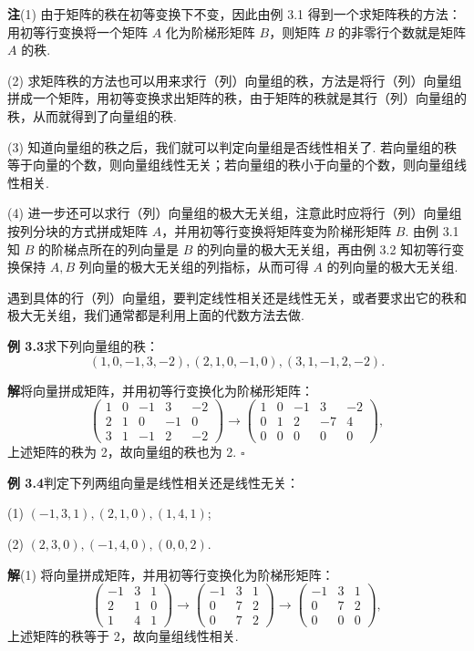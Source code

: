 \documentclass[UTF8, 12pt, fontset=fandol, oneside]{ctexart}
\begin{document}
\noindent\textbf{注}\quad (1) 由于矩阵的秩在初等变换下不变，因此由例 3.1 得到一个求矩阵秩的方法：用初等行变换将一个矩阵 $A$ 化为阶梯形矩阵 $B$，则矩阵 $B$ 的非零行个数就是矩阵 $A$ 的秩.

(2) 求矩阵秩的方法也可以用来求行（列）向量组的秩，方法是将行（列）向量组拼成一个矩阵，用初等变换求出矩阵的秩，由于矩阵的秩就是其行（列）向量组的秩，从而就得到了向量组的秩.

(3) 知道向量组的秩之后，我们就可以判定向量组是否线性相关了. 若向量组的秩等于向量的个数，则向量组线性无关；若向量组的秩小于向量的个数，则向量组线性相关.

(4) 进一步还可以求行（列）向量组的极大无关组，注意此时应将行（列）向量组按列分块的方式拼成矩阵 $A$，并用初等行变换将矩阵变为阶梯形矩阵 $B$. 由例 3.1 知 $B$ 的阶梯点所在的列向量是 $B$ 的列向量的极大无关组，再由例 3.2 知初等行变换保持 $A,B$ 列向量的极大无关组的列指标，从而可得 $A$ 的列向量的极大无关组.

遇到具体的行（列）向量组，要判定线性相关还是线性无关，或者要求出它的秩和极大无关组，我们通常都是利用上面的代数方法去做.

\noindent\textbf{例 3.3}\quad 求下列向量组的秩：
\[
(1,0,-1,3,-2),(2,1,0,-1,0),(3,1,-1,2,-2).
\]

\noindent\textbf{解}\quad 将向量拼成矩阵，并用初等行变换化为阶梯形矩阵：
\[
\begin{pmatrix}
1 & 0 & -1 & 3 & -2\\
2 & 1 & 0 & -1 & 0\\
3 & 1 & -1 & 2 & -2
\end{pmatrix}
\to
\begin{pmatrix}
1 & 0 & -1 & 3 & -2\\
0 & 1 & 2 & -7 & 4\\
0 & 0 & 0 & 0 & 0
\end{pmatrix},
\]
上述矩阵的秩为 2，故向量组的秩也为 2. $\square$

\noindent\textbf{例 3.4}\quad 判定下列两组向量是线性相关还是线性无关：

(1) $(-1,3,1),(2,1,0),(1,4,1)$;

(2) $(2,3,0),(-1,4,0),(0,0,2)$.

\noindent\textbf{解}\quad (1) 将向量拼成矩阵，并用初等行变换化为阶梯形矩阵：
\[
\begin{pmatrix}
-1 & 3 & 1\\
2 & 1 & 0\\
1 & 4 & 1
\end{pmatrix}
\to
\begin{pmatrix}
-1 & 3 & 1\\
0 & 7 & 2\\
0 & 7 & 2
\end{pmatrix}
\to
\begin{pmatrix}
-1 & 3 & 1\\
0 & 7 & 2\\
0 & 0 & 0
\end{pmatrix},
\]
上述矩阵的秩等于 2，故向量组线性相关.
\end{document}
